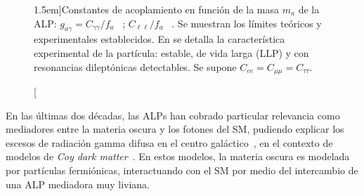 \begin{figure}[t]
  \centering
  \hfill

  \caption[][1.5em]{Constantes de acoplamiento en función de la masa $m_a$ de la ALP: $g_{a\gamma} = C_{\gamma\gamma}/f_a$ ~; $C_{\ell\ell}/f_a$ ~. Se muestran los límites teóricos y experimentales establecidos. En  se detalla la característica experimental de la partícula: estable, de vida larga (LLP) y con resonancias dileptónicas detectables. Se supone $C_{ee} = C_{\mu\mu} = C_{\tau\tau}$.}
  \label{fig:ch1:ALP:g-vs-m_a}
\end{figure}

En las últimas dos décadas, las ALPs han cobrado particular relevancia como mediadores entre la materia oscura y los fotones del SM, pudiendo explicar los escesos de radiación gamma difusa en el centro galáctico~\cites[7em][]{Hooper2011}{Abazajian2012}{Daylan2016}, en el contexto de modelos de \textit{Coy dark matter}~\cite{Bhm2014,Hektor2014}. En estos modelos, la materia oscura es modelada por partículas fermiónicas, interactuando con el SM por medio del intercambio de una ALP mediadora muy liviana.

